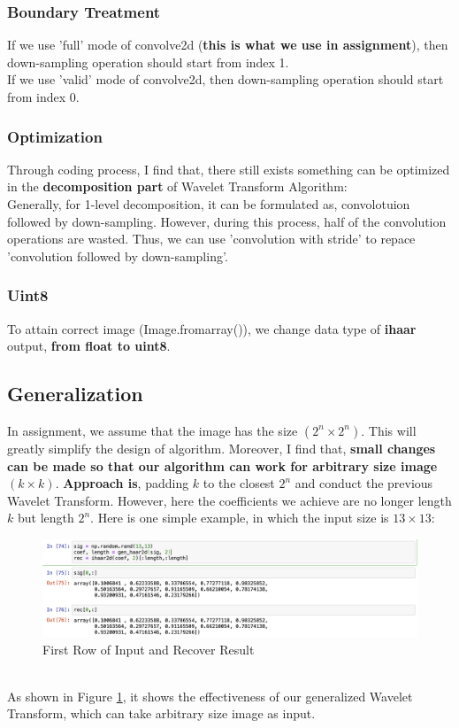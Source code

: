\documentclass{article}
\begin{document}
\subsubsection{Boundary Treatment}
If we use 'full' mode of convolve2d (\textbf{this is what we use in assignment}), then down-sampling operation should start from index 1. 
\vspace{4pt}
\\
If we use 'valid' mode of convolve2d, then down-sampling operation should start from index 0.
\subsubsection{Optimization}
Through coding process, I find that, there still exists something can be optimized in the \textbf{decomposition part} of Wavelet Transform Algorithm:
\vspace{4pt}
\\
Generally, for 1-level decomposition, it can be formulated as, convolotuion followed by down-sampling. However, during this process, half of the convolution operations are wasted. Thus, we can use 'convolution with stride' to repace 'convolution followed by down-sampling'.
\subsubsection{Uint8}
To attain correct image (Image.fromarray()), we change data type of \textbf{ihaar} output, \textbf{from float to uint8}.
\subsection{Generalization}
In assignment, we assume that the image has the size $(2^n \times 2^n)$. This will greatly simplify the design of algorithm. Moreover, I find that, \textbf{small changes can be made so that our algorithm can work for arbitrary size image $(k \times k)$}. \textbf{Approach is}, padding $k$ to the closest $2^n$ and conduct the previous Wavelet Transform. However, here the coefficients we achieve are no longer length $k$ but length $2^n$. Here is one simple example, in which the input size is $13\times 13$:
\begin{figure}[h]
	\centering
	\includegraphics[width=.55\textheight]{example.png}
	\caption{First Row of Input and Recover Result}
	\label{fig:001}
\end{figure}
\\
As shown in Figure \ref{fig:001}, it shows the effectiveness of our generalized Wavelet Transform, which can take arbitrary size image as input.
\end{document}
